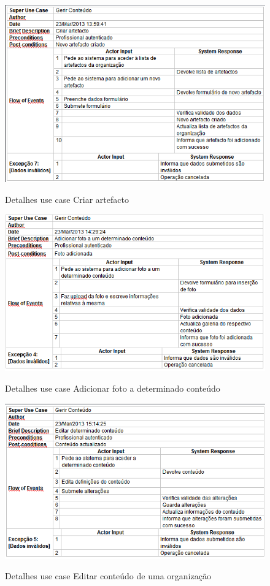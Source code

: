 \documentclass[12pt,a4paper]{article}
\begin{document}
\begin{figure}[h!]
\centering
\includegraphics[scale=0.7]{d_usecase/criarartefacto}
\label{usecase}
\caption{Detalhes use case Criar artefacto}
\end{figure}

\begin{figure}[h!]
\centering
\includegraphics[scale=0.7]{d_usecase/P_adicionarfoto}
\label{usecase}
\caption{Detalhes use case Adicionar foto a determinado conteúdo}
\end{figure}

\begin{figure}[h!]
\centering
\includegraphics[scale=0.7]{d_usecase/editarconteudo}
\label{usecase}
\caption{Detalhes use case Editar conteúdo de uma organização}
\end{figure}
\end{document}
